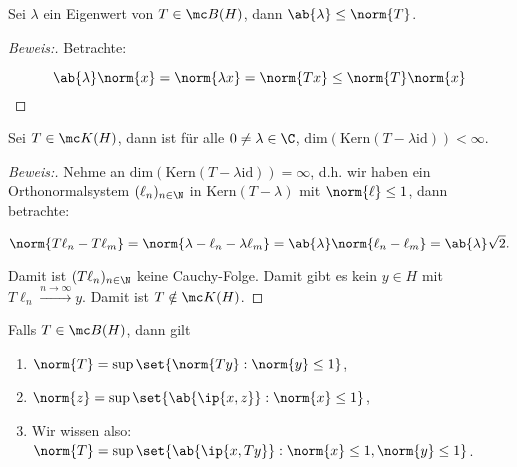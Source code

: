 \begin{theorem}
	
	Sei $\lambda$ ein Eigenwert von $T \in \mc B(H)$, dann $\ab{\lambda} \leq \norm{T}$.
	
	\begin{proof}[Beweis:]
		
		Betrachte:
		
		\[ \ab{\lambda} \norm{x} = \norm{\lambda x} = \norm{Tx} \leq \norm{T} \norm{x} \]
		
	\end{proof}
	
\end{theorem}


\begin{theorem}
	
	Sei $T \in \mc K(H)$, dann ist für alle $0 \not= \lambda \in \C$, $\text{dim}(\text{Kern}(T - \lambda \text{id})) < \infty$.
	
	\begin{proof}[Beweis:]
		
		Nehme an $\text{dim}(\text{Kern}(T - \lambda \text{id})) = \infty$, d.h. wir haben ein Orthonormalsystem $(\ell_n)_{n \in \N}$ in $\text{Kern}(T - \lambda)$ mit $\norm{\ell} \leq 1$, dann betrachte:
		
		\[ \norm{T\ell_n - T\ell_m} = \norm{\lambda - \ell_n - \lambda \ell_m} = \ab{\lambda} \norm{\ell_n - \ell_m} = \ab{\lambda}\sqrt{2}. \]
		
		Damit ist $(T \ell_n)_{n \in \N}$ keine Cauchy-Folge. Damit gibt es kein $y \in H$ mit $T \ell_n \xrightarrow{n \to \infty} y$. Damit ist $T \notin \mc K(H)$.
		
	\end{proof}
	
\end{theorem}


\begin{rem}
	
	Falls $T \in \mc B(H)$, dann gilt
	
	\begin{enumerate}
		
		\item $\norm{T} = \sup{\set{\norm{Ty}:\norm{y} \leq 1}}$,
		
		\item $\norm{z} = \sup{\set{\ab{\ip{x, z}}: \norm{x} \leq 1}}$,
		
		\item Wir wissen also: $\norm{T} = \sup{\set{\ab{\ip{x, Ty}}: \norm{x} \leq 1, \norm{y} \leq 1}}$.
		
	\end{enumerate}
	
\end{rem}


